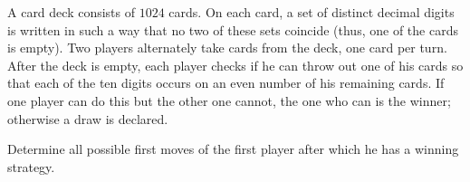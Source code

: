 A card deck consists of $1024$ cards.
On each card, a set of distinct decimal digits is written in such a way that no two of these sets coincide (thus, one of the cards is empty).
Two players alternately take cards from the deck, one card per turn.
After the deck is empty, each player checks if he can throw out one of his cards so that each of the ten digits occurs on an even number of his remaining cards.
If one player can do this but the other one cannot, the one who can is the winner; otherwise a draw is declared.

Determine all possible first moves of the first player after which he has a winning strategy.


